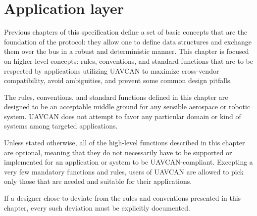 \chapter{Application layer}\label{sec:application_layer}

Previous chapters of this specification define a set of basic concepts that are the foundation of the protocol:
they allow one to define data structures and exchange them over the bus in a robust and deterministic manner.
This chapter is focused on higher-level concepts: rules, conventions, and standard functions that are to be
respected by applications utilizing UAVCAN to maximize cross-vendor compatibility, avoid ambiguities, and
prevent some common design pitfalls.

The rules, conventions, and standard functions defined in this chapter are designed to be an acceptable middle
ground for any sensible aerospace or robotic system.
UAVCAN does not attempt to favor any particular domain or kind of systems among targeted applications.

Unless stated otherwise, all of the high-level functions described in this chapter are optional,
meaning that they do not necessarily have to be supported or implemented for an application or system to be
UAVCAN-compliant.
Excepting a very few mandatory functions and rules, users of UAVCAN are allowed to pick only those
that are needed and suitable for their applications.

If a designer chose to deviate from the rules and conventions presented in this chapter,
every such deviation must be explicitly documented.

\clearpage
\clearpage
